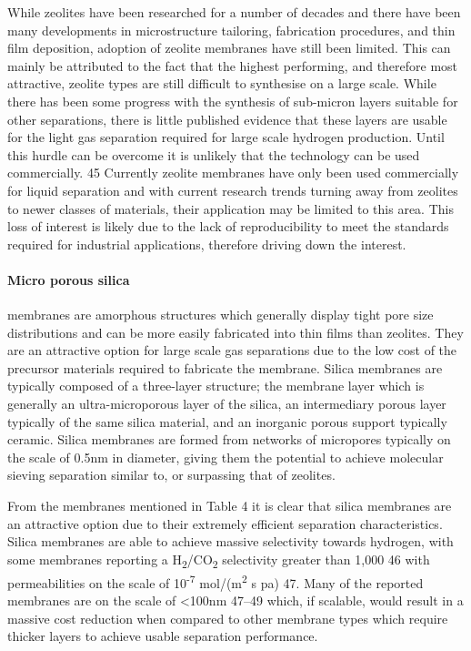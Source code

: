 While zeolites have been researched for a number of decades and there have been many 
developments in microstructure tailoring, fabrication procedures, and thin film deposition, 
adoption of zeolite membranes have still been limited. This can mainly be attributed to the 
fact that the highest performing, and therefore most attractive, zeolite types are still 
difficult to synthesise on a large scale. While there has been some progress with the 
synthesis of sub-micron layers suitable for other separations, there is little published 
evidence that these layers are usable for the light gas separation required for large scale 
hydrogen production. Until this hurdle can be overcome it is unlikely that the technology 
can be used commercially. 45 Currently zeolite membranes have only been used commercially 
for liquid separation and with current research trends turning away from zeolites to newer 
classes of materials, their application may be limited to this area. This loss of interest 
is likely due to the lack of reproducibility to meet the standards required for industrial 
applications, therefore driving down the interest. 

\paragraph{Micro porous silica} membranes are amorphous structures which generally display tight pore 
size distributions and can be more easily fabricated into thin films than zeolites. They 
are an attractive option for large scale gas separations due to the low cost of the precursor 
materials required to fabricate the membrane. Silica membranes are typically composed of a 
three-layer structure; the membrane layer which is generally an ultra-microporous layer of 
the silica, an intermediary porous layer typically of the same silica material, and an 
inorganic porous support typically ceramic. Silica membranes are formed from networks of 
micropores typically on the scale of 0.5nm in diameter, giving them the potential to achieve 
molecular sieving separation similar to, or surpassing that of zeolites. 

From the membranes mentioned in Table 4 it is clear that silica membranes are an attractive 
option due to their extremely efficient separation characteristics. Silica membranes are able 
to achieve massive selectivity towards hydrogen, with some membranes reporting a H\textsubscript{2}/CO\textsubscript{2} 
selectivity greater than 1,000 46 with permeabilities on the scale of 10\textsuperscript{-7} mol/(m\textsuperscript{2} s pa) 
47. Many of the reported membranes are on the scale of \textless 100nm 47–49 which, if scalable, 
would result in a massive cost reduction when compared to other membrane types which require 
thicker layers to achieve usable separation performance. 

